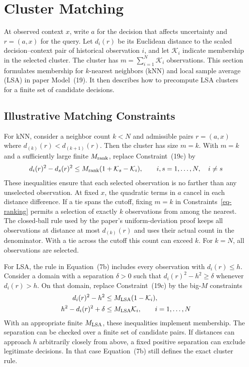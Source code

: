 \section{Cluster Matching}

At observed context \(x\), write \(a\) for the decision that affects uncertainty and \(r=(a,x)\) for the query. Let \(d_i(r)\) be its Euclidean distance to the scaled decision--context pair of historical observation \(i\), and let \(\mathcal K_i\) indicate membership in the selected cluster. The cluster has \(m=\sum_{i=1}^N\mathcal K_i\) observations. This section formulates membership for \(k\)-nearest neighbors (kNN) and local sample average (LSA) in paper Model~\textup{(19)}. It then describes how to precompute LSA clusters for a finite set of candidate decisions.

\subsection{Illustrative Matching Constraints}

For kNN, consider a neighbor count \(k<N\) and admissible pairs \(r=(a,x)\) where \(d_{(k)}(r)<d_{(k+1)}(r)\). Then the cluster has size \(m=k\). With \(m=k\) and a sufficiently large finite \(M_{\rm rank}\), replace Constraint~\textup{(19c)} by
\begin{equation}\label{eq-ranking}
 d_i(r)^2-d_s(r)^2
 \le M_{\rm rank}(1+\mathcal K_s-\mathcal K_i),
 \qquad i,s=1,\ldots,N,\quad i\ne s
\end{equation}
These inequalities ensure that each selected observation is no farther than any unselected observation. At fixed \(x\), the quadratic terms in \(a\) cancel in each distance difference. If a tie spans the cutoff, fixing \(m=k\) in Constraints~\eqref{eq-ranking} permits a selection of exactly \(k\) observations from among the nearest. The closed-ball rule used by the paper's uniform-deviation proof keeps all observations at distance at most \(d_{(k)}(r)\) and uses their actual count in the denominator. With a tie across the cutoff this count can exceed \(k\). For \(k=N\), all observations are selected.

For LSA, the rule in Equation~\textup{(7b)} includes every observation with \(d_i(r)\le h\). Consider a domain with a separation \(\delta>0\) such that \(d_i(r)^2-h^2\ge\delta\) whenever \(d_i(r)>h\). On that domain, replace Constraint~\textup{(19c)} by the big-\(M\) constraints
\begin{equation}\label{eq-LSACluster}
\begin{aligned}
 d_i(r)^2-h^2&\le M_{\rm LSA}(1-\mathcal K_i),\\
 h^2-d_i(r)^2+\delta&\le M_{\rm LSA}\mathcal K_i,\qquad i=1,\ldots,N
\end{aligned}
\end{equation}
With an appropriate finite \(M_{\rm LSA}\), these inequalities implement membership. The separation can be checked over a finite set of candidate pairs. If distances can approach \(h\) arbitrarily closely from above, a fixed positive separation can exclude legitimate decisions. In that case Equation~\textup{(7b)} still defines the exact cluster rule.


